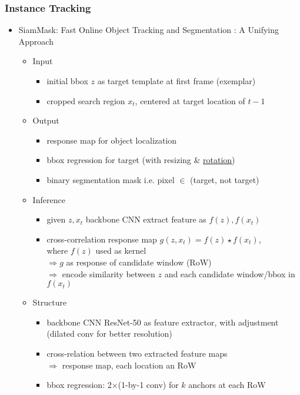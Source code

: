 \subsubsection{Instance Tracking}
\begin{itemize}
\item SiamMask: Fast Online Object Tracking and Segmentation : A Unifying Approach
	\begin{itemize}
	\item Input
		\begin{itemize}
		\item initial bbox $z$ as target template at first frame (exemplar)
		\item cropped search region $x_t$, centered at target location of $t-1$
		\end{itemize}
	\item Output
		\begin{itemize}
		\item response map for object localization
		\item bbox regression for target (with resizing \& \underline{rotation})
		\item binary segmentation mask i.e. pixel $\in$ (target, not target)
		\end{itemize}
	\item Inference
		\begin{itemize}
		\item given $z, x_t$ backbone CNN extract feature as $f(z), f(x_t)$
		\item cross-correlation response map $g(z,x_t) = f(z)\star f(x_t)$, \\
		where $f(z)$ used as kernel \\
		$\Rightarrow g$ as response of candidate window (RoW) \\
		$\Rightarrow$ encode similarity between $z$ and each candidate window/bbox in $f(x_t)$
		\end{itemize}
	\item Structure
		\begin{itemize}
		\item backbone CNN ResNet-50 as feature extractor, with adjustment \\
		(dilated conv for better resolution)
		\item cross-relation between two extracted feature maps \\ 
		$\Rightarrow$ response map, each location an RoW
		\item bbox regression: 2$\times$(1-by-1 conv) for $k$ anchors at each RoW

\end{itemize}
\end{itemize}
\end{itemize}
